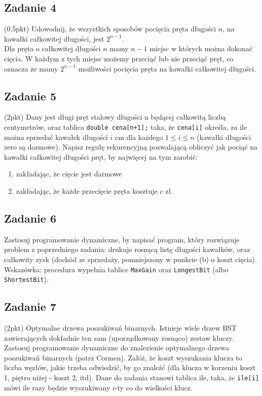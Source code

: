 \documentclass{article}
\begin{document}
\subsection*{Zadanie 4}
(0.5pkt) Udowodnij, że wszystkich sposobów pocięcia pręta długości $n$, na kawałki całkowitej długości, jest $2^{n-1}$.
\noindent \\[1em]
Dla pręta o całkowitej długości $n$ mamy $n-1$ miejsc w których można dokonać cięcia. W każdym z tych miejsc możemy
przeciąć lub nie przeciąć pręt, co oznacza że mamy $2^{n-1}$ możliwości pocięcia pręta na kawałki całkowitej długości.

\subsection*{Zadanie 5}
(2pkt) Dany jest długi pręt stalowy długości n będącej całkowitą liczbą centymetrów,
oraz tablica \verb|double cena[n+1];| taka, że \verb|cena[i]| określa, za ile można sprzedać kawałek długości $i$
cm dla każdego $1 \leq i \leq n$ (kawałki długości zero są darmowe). Napisz
regułę rekurencyjną pozwalającą obliczyć jak pociąć na kawałki całkowitej długości pręt,
by najwięcej na tym zarobić:
\begin{enumerate}[label=(\alph*)]
    \item zakładając, że cięcie jest darmowe
    \item zakładając, że każde przecięcie pręta kosztuje $c$ zł.
\end{enumerate}

\subsection*{Zadanie 6}
Zastosuj programowanie dynamiczne, by napisać program, który rozwiązuje problem
z poprzedniego zadania: drukuje rosnącą listę długości kawałków, oraz całkowity zysk
(dochód ze sprzedaży, pomniejszony w punkcie (b) o koszt cięcia).
Wskazówka: procedura wypełnia tablice \verb|MaxGain| oraz \verb|LongestBit| (albo \verb|ShortestBit|).

\subsection*{Zadanie 7}
(2pkt) Optymalne drzewa poszukiwań binarnych. Istnieje wiele drzew BST zawierających
dokładnie ten sam (uporządkowany rosnąco) zestaw kluczy. Zastosuj programowanie
dynamiczne do znalezienie optymalnego drzewa poszukiwań binarnych (patrz Cormen).
Załóż, że koszt wyszukania klucza to liczba węzłów, jakie trzeba odwiedzić, by go
znaleźć (dla klucza w korzeniu koszt 1, piętro niżej - koszt 2, itd). Dane do zadania stanowi
tablica ile, taka, że \verb|ile[i]| mówi ile razy będzie wyszukiwany $i$-ty co do wielkości klucz.
\end{document}
